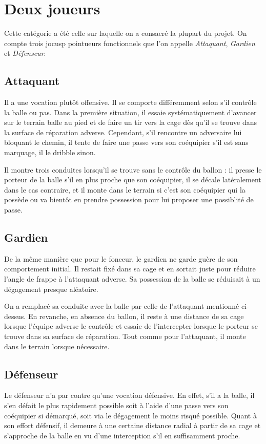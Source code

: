 \documentclass[12pt,a4paper]{article}
\begin{document}
\section{Deux joueurs}
Cette cat\'egorie a \'et\'e celle sur laquelle on a consacr\'e la plupart du 
projet. On compte trois jocusp pointueurs fonctionnels que l'on appelle 
{\itshape Attaquant}, {\itshape Gardien} et {\itshape D\'efenseur}. 

\subsection*{Attaquant}
Il a une vocation plut\^ot offensive. Il se comporte diff\'eremment selon 
s'il contr\^ole la balle ou pas. Dans la premi\`ere situation, il essaie 
syst\'ematiquement d'avancer sur le terrain balle au pied et de faire un tir 
vers la cage d\`es qu'il se trouve dans la surface de r\'eparation adverse. 
Cependant, s'il rencontre un adversaire lui bloquant le chemin, il tente de 
faire une passe vers son co\'equipier s'il est sans marquage, il le 
dribble sinon. 

Il montre trois conduites lorsqu'il se trouve sans le 
contr\^ole du ballon : il presse le porteur de la balle s'il en plus 
proche que son co\'equipier, il se d\'ecale lat\'eralement dans le cas 
contraire, et il monte dans le terrain si c'est son co\'equipier qui la 
poss\`ede ou va bient\^ot en prendre possession pour lui proposer une 
possiblit\'e de passe.

\subsection*{Gardien}
De la m\^eme mani\`ere que pour le fonceur, le gardien ne garde gu\`ere de son 
comportement initial. Il restait fix\'e dans sa cage et en sortait juste pour 
r\'eduire l'angle de frappe \`a l'attaquant adverse. Sa possession de la balle 
se r\'eduisait \`a un d\'egagement presque al\'eatoire.

On a remplac\'e sa conduite avec la balle par celle de l'attaquant 
mentionn\'e ci-dessus. En revanche, en absence du ballon, il reste \`a une 
distance de sa cage lorsque l'\'equipe adverse le contr\^ole et essaie 
de l'intercepter lorsque le porteur se trouve dans sa surface de r\'eparation. 
Tout comme pour l'attaquant, il monte dans le terrain lorsque n\'ecessaire.

\subsection*{D\'efenseur}
Le d\'efenseur n'a par contre qu'une vocation d\'efensive. En effet, s'il a la 
balle, il s'en d\'efait le plus rapidement possible soit \`a l'aide d'une passe 
vers son co\'equipier si d\'emarqu\'e, soit via le d\'egagement le moins 
risqu\'e possible. Quant \`a son effort d\'efensif, il demeure \`a une certaine 
distance radial \`a partir de sa cage et s'approche de la balle en vu d'une 
interception s'il en suffisamment proche.
\end{document}
